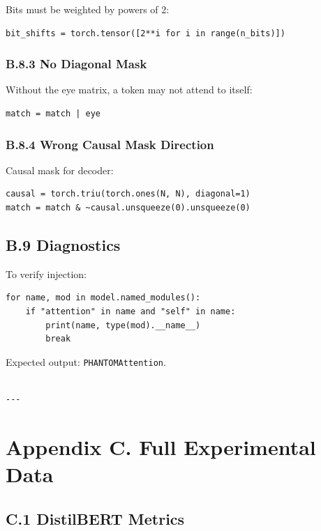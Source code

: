 Bits must be weighted by powers of 2:

\begin{lstlisting}
bit_shifts = torch.tensor([2**i for i in range(n_bits)])
\end{lstlisting}

\subsubsection{B.8.3 No Diagonal Mask}

Without the eye matrix, a token may not attend to itself:

\begin{lstlisting}
match = match | eye
\end{lstlisting}

\subsubsection{B.8.4 Wrong Causal Mask Direction}

Causal mask for decoder:

\begin{lstlisting}
causal = torch.triu(torch.ones(N, N), diagonal=1)
match = match & ~causal.unsqueeze(0).unsqueeze(0)
\end{lstlisting}

\subsection{B.9 Diagnostics}

To verify injection:

\begin{lstlisting}
for name, mod in model.named_modules():
    if "attention" in name and "self" in name:
        print(name, type(mod).__name__)
        break
\end{lstlisting}

Expected output: \texttt{PHANTOMAttention}.
\begin{lstlisting}

---
\end{lstlisting}


\section{Appendix C. Full Experimental Data}

\subsection{C.1 DistilBERT Metrics}

